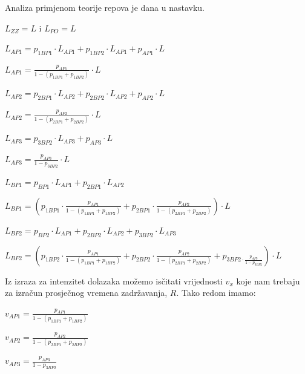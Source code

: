 \documentclass[11pt]{article}
\begin{document}
\newpage

Analiza primjenom teorije repova je dana u nastavku.

$L_{ZZ} = L$ i $L_{PO} = L$
\vspace{10px}

$L_{AP1} = p_{1BP1} \cdot L_{AP1} + p_{1BP2} \cdot L_{AP1} + p_{AP1} \cdot L $
\vspace{10px}

$L_{AP1} = \frac{p_{AP1}}{1 - (p_{1BP1} + p_{1BP2})} \cdot L$
\vspace{10px}

$L_{AP2} = p_{2BP1} \cdot L_{AP2} + p_{2BP2} \cdot L_{AP2} + p_{AP2} \cdot L $
\vspace{10px}

$L_{AP2} = \frac{p_{AP2}}{1 - (p_{2BP1} + p_{2BP2})} \cdot L$
\vspace{10px}

$L_{AP3} = p_{3BP2} \cdot L_{AP3} + p_{AP3} \cdot L $
\vspace{10px}

$L_{AP3} = \frac{p_{AP3}}{1 - p_{3BP2}} \cdot L$
\vspace{10px}

$L_{BP1} = p_{BP1} \cdot L_{AP1} + p_{2BP1} \cdot L_{AP2}$
\vspace{10px}

$L_{BP1} = (p_{1BP1} \cdot \frac{p_{AP1}}{1 - (p_{1BP1} + p_{1BP2} )} + p_{2BP1} \cdot \frac{p_{AP2}}{1 - (p_{2BP1} + p_{2BP2})}) \cdot L$
\vspace{10px}

$L_{BP2} = p_{BP2} \cdot L_{AP1} + p_{2BP2} \cdot L_{AP2} + p_{3BP2} \cdot L_{AP3}$
\vspace{10px}

$L_{BP2} = (p_{1BP2} \cdot \frac{p_{AP1}}{1 - (p_{1BP1} + p_{1BP2} )} + p_{2BP2} \cdot \frac{p_{AP2}}{1 - (p_{2BP1} + p_{2BP2})} + p_{3BP2 \cdot \frac{p_{AP3}}{1-p_{3BP2}}}) \cdot L$
\vspace{10px}

Iz izraza za intenzitet dolazaka možemo isčitati vrijednosti $v_x$ koje nam trebaju za izračun prosječnog vremena zadržavanja, $R$. 
Tako redom imamo:

$v_{AP1} = \frac{p_{AP1}}{1 - (p_{1BP1} + p_{1BP2})}$
\vspace{10px}

$v_{AP2} = \frac{p_{AP2}}{1 - (p_{2BP1} + p_{2BP2})}$
\vspace{10px}

$v_{AP3} = \frac{p_{AP3}}{1 - p_{3BP2}}$
\vspace{10px}
\end{document}
